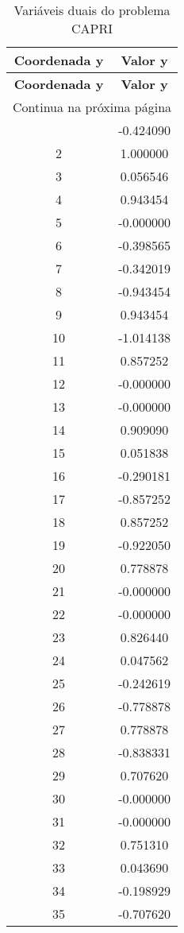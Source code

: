 \documentclass[12pt]{article}
\begin{document}
\begin{longtable}{@{}cc@{}}
\caption{Variáveis duais do problema CAPRI} \\
\toprule
\textbf{Coordenada y} & \textbf{Valor y} \\
\midrule
\endfirsthead

\toprule
\textbf{Coordenada y} & \textbf{Valor y} \\
\midrule
\endhead

\midrule \multicolumn{2}{r}{{Continua na próxima página}} \\ \midrule
\endfoot

\bottomrule
\endlastfoot
1 & -0.424090 \\
2 & 1.000000 \\
3 & 0.056546 \\
4 & 0.943454 \\
5 & -0.000000 \\
6 & -0.398565 \\
7 & -0.342019 \\
8 & -0.943454 \\
9 & 0.943454 \\
10 & -1.014138 \\
11 & 0.857252 \\
12 & -0.000000 \\
13 & -0.000000 \\
14 & 0.909090 \\
15 & 0.051838 \\
16 & -0.290181 \\
17 & -0.857252 \\
18 & 0.857252 \\
19 & -0.922050 \\
20 & 0.778878 \\
21 & -0.000000 \\
22 & -0.000000 \\
23 & 0.826440 \\
24 & 0.047562 \\
25 & -0.242619 \\
26 & -0.778878 \\
27 & 0.778878 \\
28 & -0.838331 \\
29 & 0.707620 \\
30 & -0.000000 \\
31 & -0.000000 \\
32 & 0.751310 \\
33 & 0.043690 \\
34 & -0.198929 \\
35 & -0.707620 \\

\end{longtable}
\end{document}

